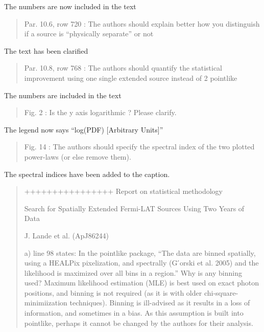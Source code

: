 \documentclass{article}
\newenvironment{referee}
{\begin{quote}\color{red}}
  {\end{quote}}
\newenvironment{reply}
  {}
  {}
\begin{document}
\begin{reply}
The numbers are now included in the text
\end{reply}

\begin{referee}
Par. 10.6, row 720 : The authors should explain better how you distinguish
if a source is ``physically separate'' or not
\end{referee}

\begin{reply}
The text has been clarified
\end{reply}

\begin{referee}
Par. 10.8, row 768 : The authors should quantify the statistical
improvement using one single extended source instead of 2 pointlike
\end{referee}

\begin{reply}
The numbers are included in the text
\end{reply}

\begin{referee}
Fig. 2 : Is the y axis logarithmic ? Please clarify.
\end{referee}

\begin{reply}
The legend now says ``log(PDF) [Arbitrary Units]''
\end{reply}

\begin{referee}
Fig. 14 : The authors should specify the spectral index of the two plotted power-laws (or else remove them).
\end{referee}

\begin{reply}
The spectral indices have been added to the caption.
\end{reply}

\begin{referee}
++++++++++++++++
Report on statistical methodology

Search for Spatially Extended Fermi-LAT Sources Using Two Years of Data

J. Lande et al. (ApJ86244)

a) line 98 states: In the pointlike package, ``The data are binned
spatially, using a HEALPix pixelization, and spectrally (G ́orski et
al. 2005) and the likelihood is maximized over all bins in a region.'' Why
is any binning used? Maximum likelihood estimation (MLE) is best used
on exact photon positions, and binning is not required (as it is with
older chi-square-minimiization techniques). Binning is ill-advised as
it results in a loss of information, and sometimes in a bias. As this
assumption is built into pointlike, perhaps it cannot be changed by the
authors for their analysis.
\end{referee}
\end{document}
